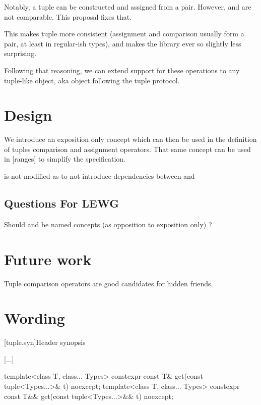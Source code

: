 \documentclass{wg21}
\begin{document}
Notably, a tuple can be constructed and assigned from a pair.
However,  and  are not comparable.
This proposal fixes that.

This makes tuple more consistent (assignment and comparison usually form a pair, at least in regular-ish types),
and makes the library ever so slightly less surprising.

Following that reasoning, we can extend support for these operations to any tuple-like object, aka object following
the tuple protocol.
 
\section{Design}

We introduce an exposition only concept  which can then be used in the definition of tuples
comparison and assignment operators.
That same concept can be used in [ranges] to simplify the specification.

 is not modified as to not introduce dependencies between  and 

\subsection{Questions For LEWG}

Should  and  be named concepts (as opposition to exposition only) ?


\section{Future work}

Tuple comparison operators are good candidates for hidden friends. 

\section{Wording}


[tuple.syn]{Header  synopsis}

[...]
\begin{codeblock}
    
template<class T, class... Types>
constexpr const T& get(const tuple<Types...>& t) noexcept;
template<class T, class... Types>
constexpr const T&& get(const tuple<Types...>&& t) noexcept;   
\end{codeblock}
\end{document}
